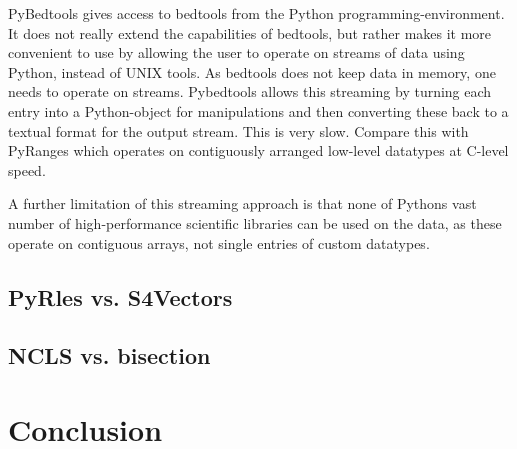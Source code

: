 \documentclass[10pt,letterpaper]{article}
\begin{document}
PyBedtools gives access to bedtools from the Python programming-environment. It
does not really extend the capabilities of bedtools, but rather makes it more
convenient to use by allowing the user to operate on streams of data using
Python, instead of UNIX tools. As bedtools does not keep data in memory, one
needs to operate on streams. Pybedtools allows this streaming by turning each
entry into a Python-object for manipulations and then converting these back to a
textual format for the output stream. This is very slow. Compare this with
PyRanges which operates on contiguously arranged low-level datatypes at C-level
speed.

A further limitation of this streaming approach is that none of Pythons vast
number of high-performance scientific libraries can be used on the data, as
these operate on contiguous arrays, not single entries of custom datatypes.

\subsection*{PyRles vs. S4Vectors}


\subsection*{NCLS vs. bisection}

\section*{Conclusion}






\end{document}
